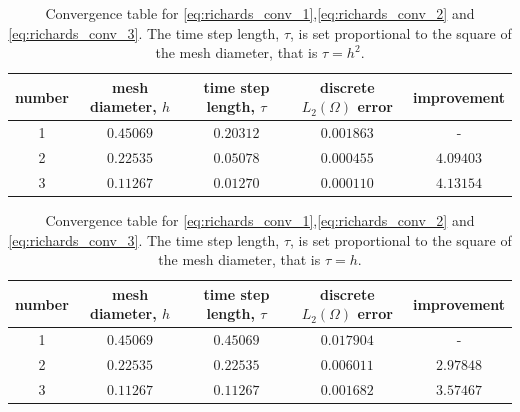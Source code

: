 \documentclass[../Main/main.tex]{subfiles}
\begin{document}
	\begin{table}[H]
		\centering
		\begin{tabular}{|c c c c c|}
			\hline
			number & mesh diameter, $h$ & time step length, $\tau$ & discrete $L_2(\Omega)$ error & improvement \\
			\hline
				1&$0.45069$&$0.20312$&$0.001863$&-\\ 
				2&$0.22535$&$0.05078$&$0.000455$&$4.09403$\\ 
				3&$0.11267$&$0.01270$&$0.000110$&$4.13154$\\
			\hline
		\end{tabular}
		\caption{Convergence table for \eqref{eq:richards_conv_1},\eqref{eq:richards_conv_2} and \eqref{eq:richards_conv_3}. The time step length, $\tau$, is set proportional to the square of the mesh diameter, that is $\tau=h^2$.}
		\label{tab:rihcards1}
	\end{table}
	\begin{table}[H]
		\centering
		\begin{tabular}{|c c c c c|}
			\hline
			number & mesh diameter, $h$ & time step length, $\tau$ & discrete $L_2(\Omega)$ error & improvement \\
			\hline
1&$0.45069$&$0.45069$&$0.017904$&-\\ 
2&$0.22535$&$0.22535$&$0.006011$&$2.97848$\\
3&$0.11267$&$0.11267$&$0.001682$&$3.57467$\\
			\hline
		\end{tabular}
		\caption{Convergence table for \eqref{eq:richards_conv_1},\eqref{eq:richards_conv_2} and \eqref{eq:richards_conv_3}. The time step length, $\tau$, is set proportional to the square of the mesh diameter, that is $\tau=h$.}
	\end{table}
\end{document}
